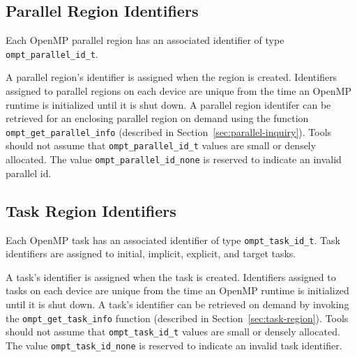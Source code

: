 \subsection{Parallel Region Identifiers}
  Each OpenMP parallel region has an associated identifier of type
  \verb|ompt_parallel_id_t|. 
\begin{comment}
\begin{quote}
\begin{verbatim}
typedef uint64_t ompt_parallel_id_t;
\end{verbatim}
\end{quote}
\end{comment}
\noindent
  A parallel region's identifier is assigned
  when the region is created.  Identifiers assigned to parallel regions on each device are unique from the time an 
  OpenMP runtime is initialized until it is shut down. 
  A parallel region identifer can be retrieved for an enclosing parallel region
  on demand using the function \verb|ompt_get_parallel_info|  (described in Section~\ref{sec:parallel-inquiry}).
  Tools should not assume that \verb|ompt_parallel_id_t| values are small or densely allocated.
  The value \verb|ompt_parallel_id_none| is reserved to indicate an invalid parallel id.
 
 
  \subsection{Task Region Identifiers}
  Each OpenMP task has an associated identifier of type
  \verb|ompt_task_id_t|. Task identifiers are assigned to
   initial, implicit, explicit, and target tasks.
\begin{comment}
\begin{quote}
\begin{verbatim}
typedef uint64_t ompt_task_id_t;
\end{verbatim}
\end{quote}
\end{comment} 
  A task's identifier is assigned
  when the task is created. 
  Identifiers assigned to tasks on each device are unique from the time an 
  OpenMP runtime is initialized until it is shut down. 
  A task's identifier can be retrieved
  on demand by invoking the \verb|ompt_get_task_info|  function (described in Section~\ref{sec:task-region}).
  Tools should not assume that \verb|ompt_task_id_t| values are small or densely allocated. 
  The value \verb|ompt_task_id_none| is reserved to indicate an invalid task identifier.
  
